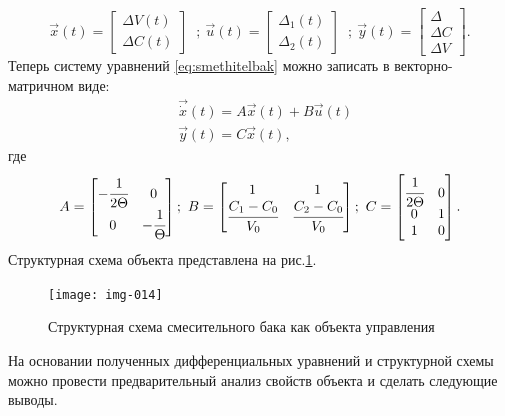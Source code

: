 \begin{equation*}
		\vec x(t)=\left[\begin{matrix}\mathit{\Delta V}(t)\\\mathit{\Delta C}(t)\end{matrix}\right]\;\;; \  \vec
		u(t)=\left[\begin{matrix}\mathit{\Delta  }_1(t)\\\mathit{\Delta  }_2(t)\end{matrix}\right]\;\;; \  \vec
		y(t)=\left[\begin{matrix}\mathit{\Delta  }\\\mathit{\Delta C}\\\mathit{\Delta V}\end{matrix}\right].
\end{equation*}
		Теперь систему уравнений \eqref{eq:smethitelbak} %
		можно записать в векторно-матричном виде:
\begin{align*}
&\vec{\dot x}(t)=A\vec x(t)+B\vec u(t)\\
&\vec y(t)=C\vec x(t),
\end{align*}
		где
\begin{equation*}
		A=\left[\begin{matrix}-\cfrac 1{2\Theta }&0\\0&-\cfrac 1 \Theta \end{matrix}\right]; \ 
		B=\left[\begin{matrix}1&1\\\cfrac{C_1-C_0}{V_0}&\cfrac{C_2-C_0}{V_0}\end{matrix}\right]; \ 
		C=\left[\begin{matrix}\cfrac 1{2\Theta }&0\\0&1\\1&0\end{matrix}\right].
\end{equation*}
\bigskip
Структурная схема объекта представлена на рис.\ref{fig:2_6}.
\begin{figure}[h]
	\centering
	\texttt{[image: img-014]} 
	\caption{Структурная схема смесительного бака как объекта управления}
	\label{fig:2_6}
\end{figure}



\bigskip


		На основании полученных  дифференциальных уравнений и структурной схемы можно провести предварительный анализ
		свойств объекта и сделать следующие выводы.



